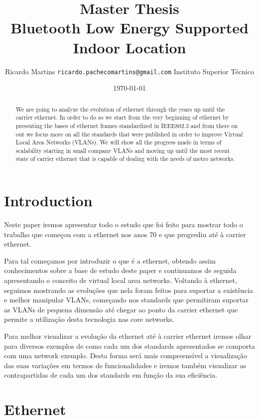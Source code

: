 \documentclass[a4paper]{IEEEtran}
\title{{ \normalsize Master Thesis} \\
	Bluetooth Low Energy Supported Indoor Location}
\author{
	Ricardo Martins {\tt ricardo.pachecomartins@gmail.com}
	Instituto Superior T\'{e}cnico}
\date{\today}
\begin{document}
\maketitle

\begin{abstract}
 We are going to analyze the evolution of ethernet through the years up until the carrier ethernet. In order to do so we start from the very beginning of ethernet by presenting the bases of ethernet frames standardized in IEEE802.3 and from there on out we focus more on all the standards that were published in order to improve Virtual Local Area Networks (VLANs). We will show all the progress made in terms of scalability starting in small company VLANs and moving up until the most recent state of carrier ethernet that is capable of dealing with the needs of metro networks. 

\end{abstract}

\section{Introduction}
\label{sec:introduction}
Neste paper iremos apresentar todo o estudo que foi feito para mostrar todo o trabalho que começou com a ethernet nos anos 70 e que progrediu até à carrier ethernet.

Para tal começamos por introduzir o que é a ethernet, obtendo assim conhecimentos sobre a base de estudo deste paper e continuamos de seguida apresentando o conceito de virtual local area networks. Voltando à ethernet, seguimos mostrando as evoluções que nela foram feitos para suportar a existência e melhor manipular VLANs, começando nos standards que permitiram suportar as VLANs de pequena dimensão até chegar ao ponto da carrier ethernet que permite a utilização desta tecnologia nas core networks.

Para melhor visualizar a evolução da ethernet até à carrier ethernet iremos olhar para diversos exemplos de como cada um dos standards apresentados se comporta com uma network exemplo.
 Desta forma será mais compreensível a visualização das suas variações em termos de funcionalidades e iremos também visualizar as contrapartidas de cada um dos standards em função da sua eficiência.

\section{Ethernet}
\label{sec:Ethernet}
\end{document}
